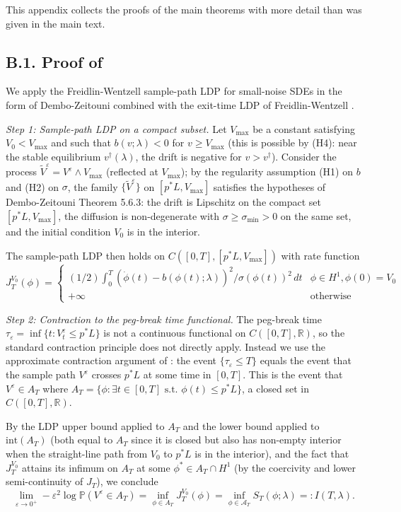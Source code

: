 \documentclass[11pt,a4paper]{article}
\theoremstyle{plain}
\theoremstyle{definition}
\newcommand{\R}{\mathbb{R}}
\renewcommand{\P}{\mathbb{P}}
\newcommand{\eps}{\varepsilon}
\begin{document}
This appendix collects the proofs of the main theorems with more detail than was given in the main text.

\subsection*{B.1. Proof of }

We apply the Freidlin-Wentzell sample-path LDP for small-noise SDEs in the form of Dembo-Zeitouni \cite[Theorem 5.6.3]{DemboZeitouni2010} combined with the exit-time LDP of Freidlin-Wentzell \cite[Chapter 4]{FreidlinWentzell2012}.

\emph{Step 1: Sample-path LDP on a compact subset.} Let $V_{\max}$ be a constant satisfying $V_0 < V_{\max}$ and such that $b(v;\lambda) < 0$ for $v \geq V_{\max}$ (this is possible by (H4): near the stable equilibrium $v^\dagger(\lambda)$, the drift is negative for $v > v^\dagger$). Consider the process $\tilde V^\eps = V^\eps \wedge V_{\max}$ (reflected at $V_{\max}$); by the regularity assumption (H1) on $b$ and (H2) on $\sigma$, the family $\{\tilde V^\eps\}$ on $[p^*L, V_{\max}]$ satisfies the hypotheses of Dembo-Zeitouni Theorem 5.6.3: the drift is Lipschitz on the compact set $[p^*L, V_{\max}]$, the diffusion is non-degenerate with $\sigma \geq \sigma_{\min} > 0$ on the same set, and the initial condition $V_0$ is in the interior.

The sample-path LDP then holds on $C([0,T], [p^*L, V_{\max}])$ with rate function
$$J_T^{V_0}(\phi) = \begin{cases}
(1/2)\int_0^T (\dot\phi(t) - b(\phi(t);\lambda))^2/\sigma(\phi(t))^2\,dt & \phi \in H^1, \phi(0) = V_0 \\
+\infty & \text{otherwise}
\end{cases}$$

\emph{Step 2: Contraction to the peg-break time functional.} The peg-break time $\tau_\eps = \inf\{t : V^\eps_t \leq p^*L\}$ is not a continuous functional on $C([0,T],\R)$, so the standard contraction principle does not directly apply. Instead we use the approximate contraction argument of \cite[\S 5.7]{DemboZeitouni2010}: the event $\{\tau_\eps \leq T\}$ equals the event that the sample path $V^\eps$ crosses $p^*L$ at some time in $[0,T]$. This is the event that $V^\eps \in A_T$ where $A_T = \{\phi : \exists t\in[0,T]\text{ s.t. }\phi(t) \leq p^*L\}$, a closed set in $C([0,T],\R)$.

By the LDP upper bound applied to $A_T$ and the lower bound applied to $\text{int}(A_T)$ (both equal to $A_T$ since it is closed but also has non-empty interior when the straight-line path from $V_0$ to $p^*L$ is in the interior), and the fact that $J_T^{V_0}$ attains its infimum on $A_T$ at some $\phi^* \in A_T \cap H^1$ (by the coercivity and lower semi-continuity of $J_T$), we conclude
$$\lim_{\eps \to 0^+} -\eps^2\log\P(V^\eps \in A_T) = \inf_{\phi\in A_T} J_T^{V_0}(\phi) = \inf_{\phi\in\mathcal A_T} S_T(\phi;\lambda) =: I(T,\lambda).$$
\end{document}
